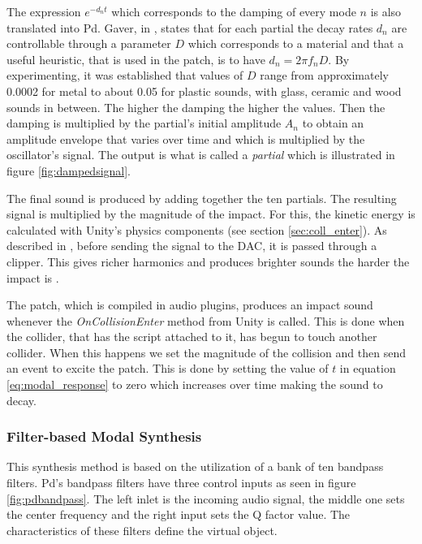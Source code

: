 The expression $e^{-d_n t}$ which corresponds to the damping of every mode $n$ is also translated into \gls{Pd}. Gaver, in \cite{gaver1993we}, states that for each partial the decay rates $d_n$ are controllable through a parameter $D$ which corresponds to a material and that a useful heuristic, that is used in the patch, is to have $d_n = 2 \pi f_nD$. By experimenting, it was established that values of $D$ range from approximately 0.0002 for metal to about 0.05 for plastic sounds, with glass, ceramic and wood sounds in between. The higher the damping the higher the values. Then the damping is multiplied by the partial's initial amplitude $A_n$ to obtain an amplitude envelope that varies over time and which is multiplied by the oscillator's signal. The output is what is called a \textit{partial} which is illustrated in figure \ref{fig:dampedsignal}. 

The final sound is produced by adding together the ten partials. The resulting signal is multiplied by the magnitude of the impact. For this, the kinetic energy is calculated with Unity\textsuperscript{\textregistered}'s physics components (see section \ref{sec:coll_enter}). As described in \cite{farnell2010designing}, before sending the signal to the \gls{DAC}, it is passed through a clipper. This gives richer harmonics and produces brighter sounds the harder the impact is \cite{aramaki2009thinking}.

The patch, which is compiled in audio plugins, produces an impact sound whenever the \textit{OnCollisionEnter} \cite{bib:unity_doc} method from Unity\textsuperscript{\textregistered} is called. This is done when the collider, that has the script attached to it, has begun to touch another collider. When this happens we set the magnitude of the collision and then send an event to excite the patch. This is done by setting the value of $t$ in equation \ref{eq:modal_response} to zero which increases over time making the sound to decay.

\subsubsection{Filter-based Modal Synthesis}\label{sec:filter_synth}

This synthesis method is based on the utilization of a bank of ten bandpass filters. \gls{Pd}'s bandpass filters have three control inputs as seen in figure \ref{fig:pdbandpass}. The left inlet is the incoming audio signal, the middle one sets the center frequency and the right input sets the \gls{Q} factor value. The characteristics of these filters define the virtual object.

